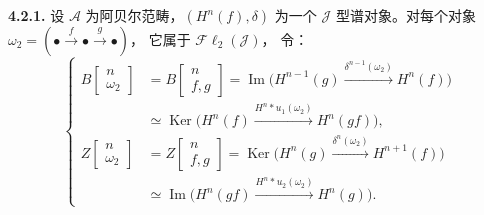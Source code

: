 \medskip\noindent\textbf{4.2.1.}\quad
设 $\mathcal A$ 为阿贝尔范畴，$(H^n(f),\delta)$ 为一个
$\mathcal J$ 型谱对象。对每个对象
$\omega_2=(\mathord\bullet\xrightarrow f\mathord\bullet\xrightarrow g\mathord\bullet)$，
它属于 $\mathcal{F}\ell_2(\mathcal J)$，
令：
\[
\left\{
\begin{aligned}
B\!\left[\begin{smallmatrix}n\\\omega_2\end{smallmatrix}\right]
&=B\!\left[\begin{smallmatrix}n\\f,g\end{smallmatrix}\right]
=\operatorname{Im}\bigl(H^{n-1}(g)
  \xrightarrow{\delta^{n-1}(\omega_2)}H^n(f)\bigr)\\
&\simeq\operatorname{Ker}\bigl(H^n(f)
  \xrightarrow{H^n*u_1(\omega_2)}H^n(gf)\bigr),\\[2pt]
Z\!\left[\begin{smallmatrix}n\\\omega_2\end{smallmatrix}\right]
&=Z\!\left[\begin{smallmatrix}n\\f,g\end{smallmatrix}\right]
=\operatorname{Ker}\bigl(H^n(g)
  \xrightarrow{\delta^n(\omega_2)}H^{n+1}(f)\bigr)\\
&\simeq\operatorname{Im}\bigl(H^n(gf)
  \xrightarrow{H^n*u_2(\omega_2)}H^n(g)\bigr).
\end{aligned}
\right.
\tag{4.2.1.1}
\]
\endgroup
